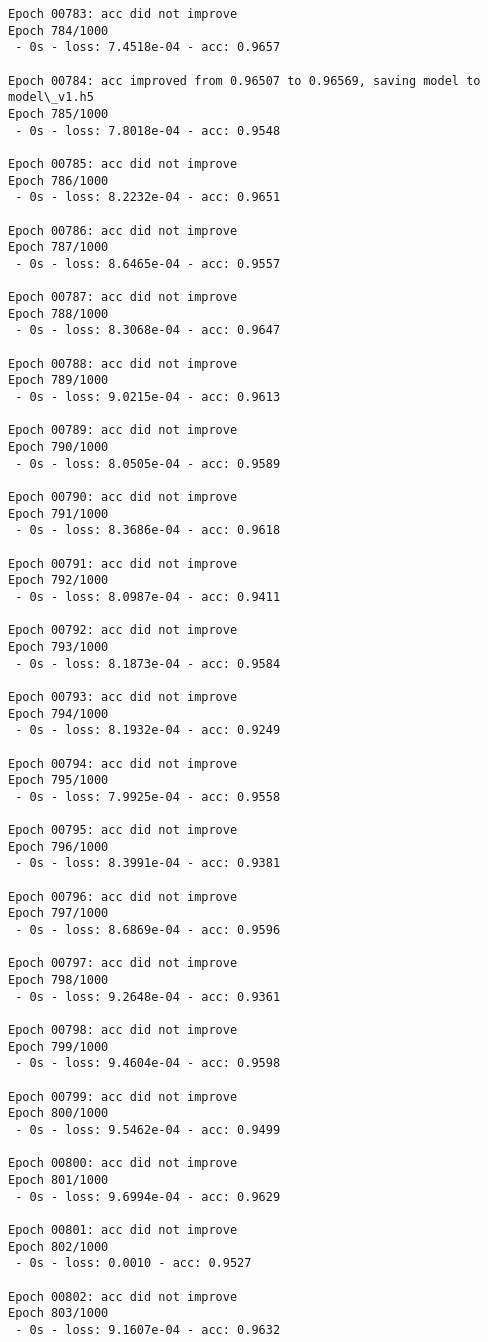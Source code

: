 \documentclass[11pt]{article}
\begin{document}
\begin{Verbatim}[commandchars=\\\{\}]
Epoch 00783: acc did not improve
Epoch 784/1000
 - 0s - loss: 7.4518e-04 - acc: 0.9657

Epoch 00784: acc improved from 0.96507 to 0.96569, saving model to model\_v1.h5
Epoch 785/1000
 - 0s - loss: 7.8018e-04 - acc: 0.9548

Epoch 00785: acc did not improve
Epoch 786/1000
 - 0s - loss: 8.2232e-04 - acc: 0.9651

Epoch 00786: acc did not improve
Epoch 787/1000
 - 0s - loss: 8.6465e-04 - acc: 0.9557

Epoch 00787: acc did not improve
Epoch 788/1000
 - 0s - loss: 8.3068e-04 - acc: 0.9647

Epoch 00788: acc did not improve
Epoch 789/1000
 - 0s - loss: 9.0215e-04 - acc: 0.9613

Epoch 00789: acc did not improve
Epoch 790/1000
 - 0s - loss: 8.0505e-04 - acc: 0.9589

Epoch 00790: acc did not improve
Epoch 791/1000
 - 0s - loss: 8.3686e-04 - acc: 0.9618

Epoch 00791: acc did not improve
Epoch 792/1000
 - 0s - loss: 8.0987e-04 - acc: 0.9411

Epoch 00792: acc did not improve
Epoch 793/1000
 - 0s - loss: 8.1873e-04 - acc: 0.9584

Epoch 00793: acc did not improve
Epoch 794/1000
 - 0s - loss: 8.1932e-04 - acc: 0.9249

Epoch 00794: acc did not improve
Epoch 795/1000
 - 0s - loss: 7.9925e-04 - acc: 0.9558

Epoch 00795: acc did not improve
Epoch 796/1000
 - 0s - loss: 8.3991e-04 - acc: 0.9381

Epoch 00796: acc did not improve
Epoch 797/1000
 - 0s - loss: 8.6869e-04 - acc: 0.9596

Epoch 00797: acc did not improve
Epoch 798/1000
 - 0s - loss: 9.2648e-04 - acc: 0.9361

Epoch 00798: acc did not improve
Epoch 799/1000
 - 0s - loss: 9.4604e-04 - acc: 0.9598

Epoch 00799: acc did not improve
Epoch 800/1000
 - 0s - loss: 9.5462e-04 - acc: 0.9499

Epoch 00800: acc did not improve
Epoch 801/1000
 - 0s - loss: 9.6994e-04 - acc: 0.9629

Epoch 00801: acc did not improve
Epoch 802/1000
 - 0s - loss: 0.0010 - acc: 0.9527

Epoch 00802: acc did not improve
Epoch 803/1000
 - 0s - loss: 9.1607e-04 - acc: 0.9632


\end{Verbatim}
\end{document}
